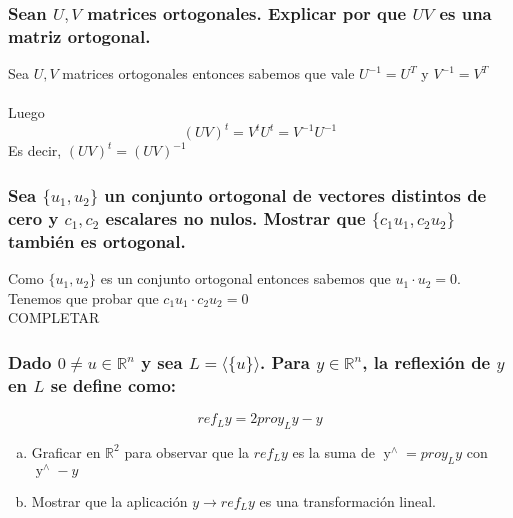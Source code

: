 \documentclass{article}
\begin{document}
\subsubsection{Sean $U,V$ matrices ortogonales. Explicar por que $UV$ es una matriz ortogonal.}
Sea $U,V$ matrices ortogonales entonces sabemos que vale $U^{-1} = U^T$ y $V^{-1} = V^T$ \\ \\
Luego
\[
(UV)^t = V^tU^t = V^{-1}U^{-1}
\]
Es decir, $(UV)^t = (UV)^{-1}$

\subsubsection{Sea $\{ u_1,u_2 \}$ un conjunto ortogonal de vectores distintos de cero y $c_1,c_2$ 
escalares no nulos. Mostrar que $\{ c_1 u_1, c_2 u_2\}$ también es ortogonal.}
Como $\{ u_1,u_2\}$ es un conjunto ortogonal entonces sabemos que $u_1 \cdot u_2 = 0$. \\
Tenemos que probar que $c_1 u_1 \cdot c_2 u_2 = 0$ \\
COMPLETAR
\subsubsection{Dado $0 \not = u \in \mathbb{R}^n$ y sea $L = \langle \{ u \}\rangle$. Para $y \in \mathbb{R}^n$,
la reflexión de $y$ en $L$ se define como: }
\[
{ref}_L y = 2 {proy}_L y - y
\]
\begin{enumerate}[a.]
\item
	Graficar en $\mathbb{R}^2$ para observar que la ${ref}_L y $ es la suma de $\displaystyle
	\mathop{y}^\wedge = {proy}_L y$ con $\displaystyle \mathop{y}^\wedge - y$
\item
	Mostrar que la aplicación $y \rightarrow {ref}_L y$ es una transformación lineal.
\end{enumerate}
\end{document}
